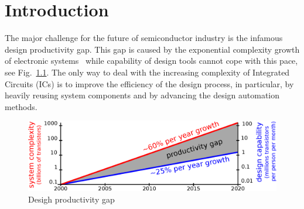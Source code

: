 
\chapter{Introduction}



The major challenge for the future of semiconductor industry is the infamous design productivity gap. This gap is caused by the exponential complexity growth of electronic systems~\cite{Moore_1965_e}  while capability of design tools cannot cope with this pace, see Fig.~\ref{fig:productivity_gap}. The only way to deal with the increasing complexity of Integrated Circuits (ICs) is to improve the efficiency of the design process, in particular, by heavily reusing system components and by advancing the design automation methods.

\begin{figure}
\centering
  \includegraphics[scale=0.5]{fig/figs/productivity_gap}
  \caption{
    \label{fig:productivity_gap}
    Desigh productivity gap}
\end{figure}



